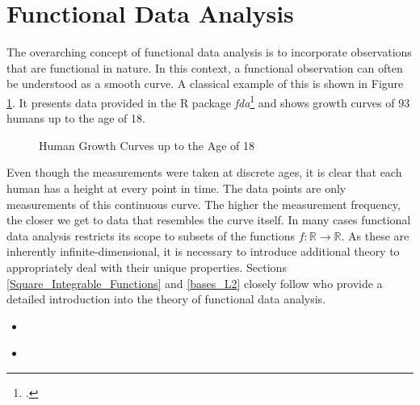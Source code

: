 \documentclass[12pt, a4paper]{article}
\theoremstyle{MAstyle} \newtheorem{assumption}{Assumption}[section]
\theoremstyle{MAstyle} \newtheorem{definition}{Definition}[section]
\theoremstyle{MAstyle} \newtheorem{theorem}{Theorem}[section]
\begin{document}
	\section{Functional Data Analysis}\label{FDA}
		The overarching concept of functional data analysis is to incorporate observations that are functional in nature. In this context, a functional observation can often be understood as a smooth curve. A classical example of this is shown in Figure \ref{growth_curves}. It presents data provided in the R package \textit{fda}\footcite{fda} and shows growth curves of 93 humans up to the age of 18.
		\begin{figure}[H]
			\caption{Human Growth Curves up to the Age of 18}
			\label{growth_curves}
		\end{figure}
		Even though the measurements were taken at discrete ages, it is clear that each human has a height at every point in time. The data points are only measurements of this continuous curve. The higher the measurement frequency, the closer we get to data that resembles the curve itself.
		In many cases functional data analysis restricts its scope to subsets of the functions $f:\mathbb{R} \rightarrow \mathbb{R}$.
		As these are inherently infinite-dimensional, it is necessary to introduce additional theory to appropriately deal with their unique properties. Sections \ref{Square_Integrable_Functions} and \ref{bases_L2} closely follow \cite{hsing_theoretical_2015} who provide a detailed introduction into the theory of functional data analysis.
		
		\begin{itemize}
			\item \cite{ramsay_functional_2005}
			\item \cite{kokoszka_introduction_2021}
		\end{itemize}
	
\end{document}
